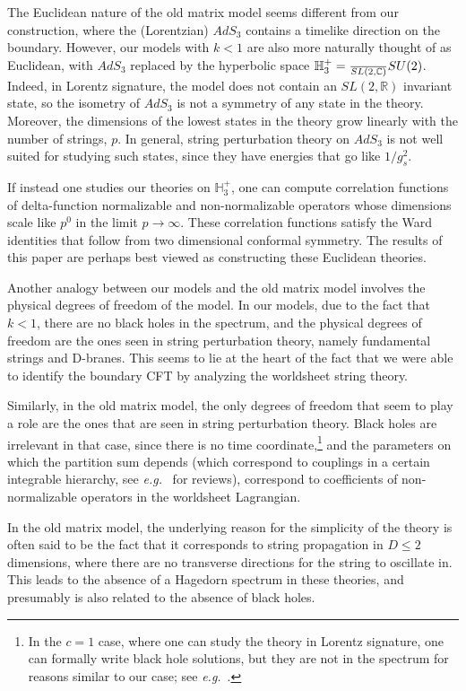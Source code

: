 \documentclass[12pt]{article}
\def\sltwoc{\ensuremath{SL(2,\bC)}}
\def\sutwo{{SU(2)}}
\def\eg{{e.g.}}
\newcommand{\bC}{{\mathbb C}}
\newcommand{\bH}{{\mathbb H}}
\newcommand{\bR}{{\mathbb R}}
\numberwithin{equation}{section}
\def\eg{{\it e.g.}}
\def\eg{{\it e.g.}}
\begin{document}
The Euclidean nature of the old matrix model seems different from our construction, where the (Lorentzian) $AdS_3$ contains a timelike direction on the boundary. However, our models with $k<1$ are also more naturally thought of as Euclidean, with $AdS_3$ replaced by the hyperbolic space $\bH_3^+=\frac\sltwoc\sutwo$. Indeed, in Lorentz signature, the model does not contain an $SL(2,\bR)$ invariant state, so the isometry of $AdS_3$ is not a symmetry of any state in the theory. Moreover, the dimensions of the lowest states in the theory grow linearly with the number of strings, $p$. In general, string perturbation theory on $AdS_3$ is not well suited for studying such states, since they have energies that go like $1/g_s^2$. 

If instead one studies our theories on $\bH_3^+$, one can compute correlation functions of delta-function normalizable and non-normalizable operators whose dimensions scale like $p^0$ in the limit $p\to\infty$. These correlation functions satisfy the Ward identities that follow from two dimensional conformal symmetry. The results of this paper are perhaps best viewed as constructing these Euclidean theories.  

Another analogy between our models and the old matrix model involves the physical degrees of freedom of the model. In our models, due to the fact that $k<1$, there are no black holes in the spectrum, and the physical degrees of freedom are the ones seen in string perturbation theory, namely fundamental strings and D-branes. This seems to lie at the heart of the fact that we were able to identify the boundary CFT by analyzing the worldsheet string theory. 

Similarly, in the old matrix model, the only degrees of freedom that seem to play a role are the ones that are seen in string perturbation theory. Black holes are irrelevant in that case, since there is no time coordinate,\footnote{In the $c=1$ case, where one can study the theory in Lorentz signature, one can formally write black hole solutions, but they are not in the spectrum for reasons similar to our case; see \eg~.} and the parameters on which the partition sum depends (which correspond to couplings in a certain integrable hierarchy, see \eg~ for reviews), correspond to coefficients of non-normalizable operators in the worldsheet Lagrangian. 

In the old matrix model, the underlying reason for the simplicity of the theory is often said to be the fact that it corresponds to string propagation in $D\le 2$ dimensions, where there are no transverse directions for the string to oscillate in. This leads to the absence of a Hagedorn spectrum in these theories, and presumably is also related to the absence of black holes. 
\end{document}
